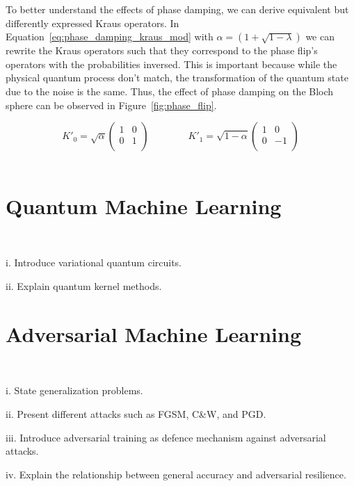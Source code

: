 To better understand the effects of phase damping, we can derive equivalent but
differently expressed Kraus operators. In Equation~\ref{eq:phase_damping_kraus_mod}
with \(\alpha = \left(1 + \sqrt{1 - \lambda}\right)\) we can rewrite the
Kraus operators such that they correspond to the phase flip's operators with
the probabilities inversed. This is important because while the physical
quantum process don't match, the transformation of the quantum state due to
the noise is the same. Thus, the effect of phase damping on the Bloch sphere
can be observed in Figure~\ref{fig:phase_flip}. \

\begin{equation}\label{eq:phase_damping_kraus_mod}
  K'_0 = \sqrt{\alpha} \begin{pmatrix}
    1 & 0 \\
    0 & 1 \\
  \end{pmatrix} \qquad \qquad
  K'_1 = \sqrt{1-\alpha} \begin{pmatrix}
    1 & 0 \\
    0 & -1 \\
  \end{pmatrix}
\end{equation} \


\section{Quantum Machine Learning} \




i.	Introduce variational quantum circuits. \


ii.	Explain quantum kernel methods. \

\section{Adversarial Machine Learning} \


i.	State generalization problems.  \

ii.	Present different attacks such as FGSM, C\&W, and PGD\@. \

iii.	Introduce adversarial training as defence mechanism against adversarial attacks. \

iv.	Explain the relationship between general accuracy and adversarial resilience. \